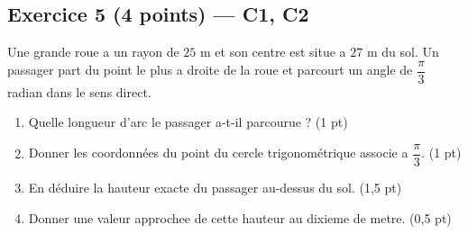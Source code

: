 \subsection*{Exercice 5 \hfill (4 points) — C1, C2}

Une grande roue a un rayon de $25$ m et son centre est situe a $27$ m du sol. Un passager part du point le plus a droite de la roue et parcourt un angle de $\dfrac{\pi}{3}$ radian dans le sens direct.

\begin{enumerate}
  \item Quelle longueur d'arc le passager a-t-il parcourue ? \hfill (1 pt)
  \item Donner les coordonnées du point du cercle trigonométrique associe a $\dfrac{\pi}{3}$. \hfill (1 pt)
  \item En déduire la hauteur exacte du passager au-dessus du sol. \hfill (1,5 pt)
  \item Donner une valeur approchee de cette hauteur au dixieme de metre. \hfill (0,5 pt)
\end{enumerate}
